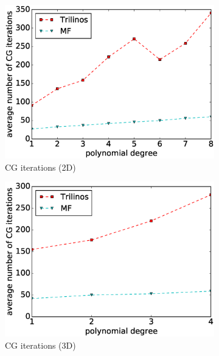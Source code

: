 \documentclass[times,doublespace]{nmeauth}
\begin{document}
\begin{figure}[!ht]
  \begin{subfigure}[b]{0.49\textwidth}
    \centering
    \includegraphics[width=\textwidth]{IWR_cg2d.eps}
    \caption{CG iterations (2D)}
    \label{fig:benchmark_miehe_IWR_cg2}
  \end{subfigure}
  \begin{subfigure}[b]{0.49\textwidth}
    \centering
    \includegraphics[width=\textwidth]{IWR_cg3d.eps}
    \caption{CG iterations (3D)}
    \label{fig:benchmark_miehe_IWR_cg3}
  \end{subfigure}
  ~
  \begin{subfigure}[b]{0.49\textwidth}
    \centering

\end{subfigure}
\end{figure}
\end{document}
